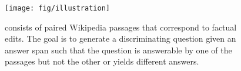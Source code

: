 \begin{figure}[t]
\texttt{[image: fig/illustration]}
\caption{\dataset{} consists of paired Wikipedia passages that correspond to factual edits. The goal is to generate a discriminating question given an answer span such that the question is answerable by  one of the passages but not the other or yields different answers.}
\label{fig:diffqg}
\end{figure}